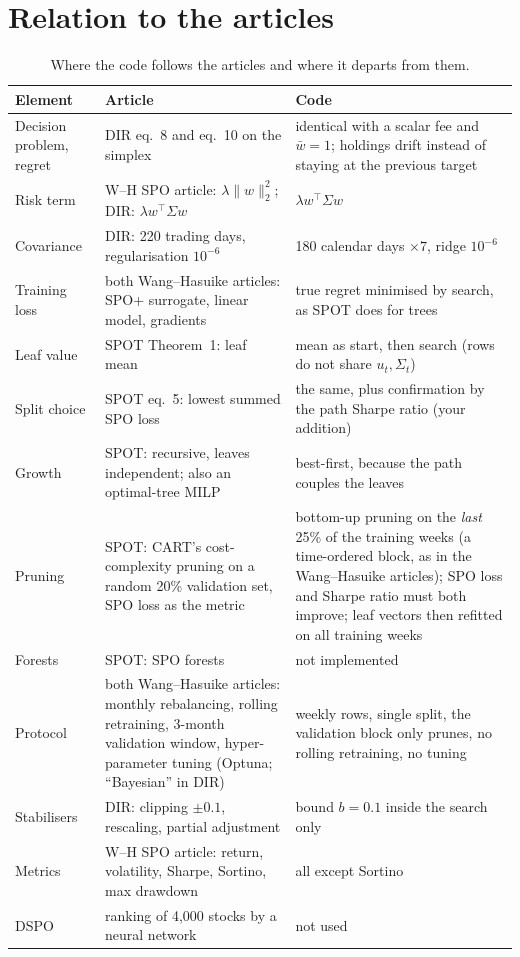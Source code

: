\documentclass[11pt,a4paper]{article}
\newcommand{\1}{\mathbf{1}}
\begin{document}
\appendix
\section{Relation to the articles}
\begin{table}[H]
\centering\small
\begin{tabularx}{\linewidth}{@{}l L L@{}}
\toprule
Element & Article & Code\\
\midrule
Decision problem, regret & DIR eq.~8 and eq.~10 on the simplex & identical with a scalar fee and $\bar w=1$; holdings drift instead of staying at the previous target\\
Risk term & W--H SPO article: $\lambda\|w\|_2^2$; DIR: $\lambda w^\top\Sigma w$ & $\lambda w^\top\Sigma w$\\
Covariance & DIR: 220 trading days, regularisation $10^{-6}$ & 180 calendar days $\times7$, ridge $10^{-6}$\\
Training loss & both Wang--Hasuike articles: SPO+ surrogate, linear model, gradients & true regret minimised by search, as SPOT does for trees\\
Leaf value & SPOT Theorem~1: leaf mean & mean as start, then search (rows do not share $u_t,\Sigma_t$)\\
Split choice & SPOT eq.~5: lowest summed SPO loss & the same, plus confirmation by the path Sharpe ratio (your addition)\\
Growth & SPOT: recursive, leaves independent; also an optimal-tree MILP & best-first, because the path couples the leaves\\
Pruning & SPOT: CART's cost-complexity pruning on a random 20\% validation set, SPO loss as the metric & bottom-up pruning on the \emph{last} 25\% of the training weeks (a time-ordered block, as in the Wang--Hasuike articles); SPO loss and Sharpe ratio must both improve; leaf vectors then refitted on all training weeks\\
Forests & SPOT: SPO forests & not implemented\\
Protocol & both Wang--Hasuike articles: monthly rebalancing, rolling retraining, 3-month validation window, hyper-parameter tuning (Optuna; ``Bayesian'' in DIR) & weekly rows, single split, the validation block only prunes, no rolling retraining, no tuning\\
Stabilisers & DIR: clipping $\pm0.1$, rescaling, partial adjustment & bound $b=0.1$ inside the search only\\
Metrics & W--H SPO article: return, volatility, Sharpe, Sortino, max drawdown & all except Sortino\\
DSPO & ranking of 4,000 stocks by a neural network & not used\\
\bottomrule
\end{tabularx}
\caption{Where the code follows the articles and where it departs from them.}
\end{table}
\end{document}
